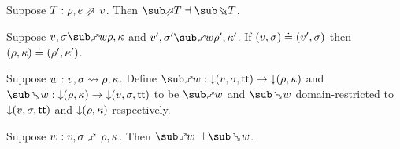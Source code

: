 \begin{theorem}
\label{thm:core-language:eval:gc}
   Suppose $T: \rho, e \evalFwdS v$.  Then $\evalFwdF{T} \adjoint \evalBwdF{T}$.
\end{theorem}

\begin{lemma}
   Suppose $v, \sigma \matchFwdR{w} \rho, \kappa$ and $v', \sigma' \matchFwdR{w} \rho', \kappa'$. If $(v, \sigma) \doteq (v', \sigma)$ then $(\rho, \kappa) \doteq (\rho', \kappa')$.
\end{lemma}

\begin{definition}
   Suppose $w: v, \sigma \rightsquigarrow \rho, \kappa$. Define $\matchFwdF{w}: \Below{(v,\sigma,\TT)} \to \Below{(\rho,\kappa)}$ and $\matchBwdF{w}: \Below{(\rho,\kappa)} \to \Below{(v,\sigma,\TT)}$ to be $\matchFwdR{w}$ and $\matchBwdR{w}$ domain-restricted to ${\downarrow}{(v,\sigma,\mathsf{tt})}$ and ${\downarrow}{(\rho,\kappa)}$ respectively.
\end{definition}

\begin{theorem}
\label{thm:core-language:match:gc}
   Suppose $w: v, \sigma \matchFwdS \rho, \kappa$.  Then $\matchFwdF{w} \adjoint \matchBwdF{w}$.
\end{theorem}
